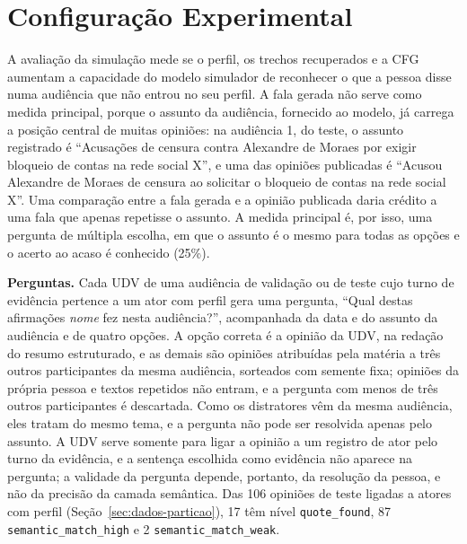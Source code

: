 \section{Configura\c{c}\~ao Experimental}
\label{sec:setup}

A avaliação da simulação mede se o perfil, os trechos recuperados e a CFG aumentam a capacidade do
modelo simulador de reconhecer o que a pessoa disse numa audiência que não entrou no seu perfil. A
fala gerada não serve como medida principal, porque o assunto da audiência, fornecido ao modelo, já
carrega a posição central de muitas opiniões: na audiência 1, do teste, o assunto registrado é
``Acusações de censura contra Alexandre de Moraes por exigir bloqueio de contas na rede social X'', e
uma das opiniões publicadas é ``Acusou Alexandre de Moraes de censura ao solicitar o bloqueio de
contas na rede social X''. Uma comparação entre a fala gerada e a opinião publicada daria crédito a
uma fala que apenas repetisse o assunto. A medida principal é, por isso, uma pergunta de múltipla
escolha, em que o assunto é o mesmo para todas as opções e o acerto ao acaso é conhecido (25\%).

\textbf{Perguntas.} Cada UDV de uma audiência de validação ou de teste cujo turno de evidência
pertence a um ator com perfil gera uma pergunta, ``Qual destas afirmações \textit{nome} fez nesta
audiência?'', acompanhada da data e do assunto da audiência e de quatro opções. A opção correta é a
opinião da UDV, na redação do resumo estruturado, e as demais são opiniões atribuídas pela matéria a
três outros participantes da mesma audiência, sorteados com semente fixa; opiniões da própria pessoa
e textos repetidos não entram, e a pergunta com menos de três outros participantes é descartada. Como
os distratores vêm da mesma audiência, eles tratam do mesmo tema, e a pergunta não pode ser resolvida
apenas pelo assunto. A UDV serve somente para ligar a opinião a um registro de ator pelo turno da
evidência, e a sentença escolhida como evidência não aparece na pergunta; a validade da pergunta
depende, portanto, da resolução da pessoa, e não da precisão da camada semântica. Das 106 opiniões de
teste ligadas a atores com perfil (Seção~\ref{sec:dados-particao}), 17 têm nível
\texttt{quote\_found}, 87 \texttt{semantic\_match\_high} e 2 \texttt{semantic\_match\_weak}.

